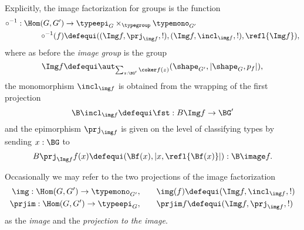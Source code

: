 Explicitly, the image factorization for groups is the function
\begin{align*}
\circ^{-1}:\Hom(G,G')&\to\typeepi_G\times_{\typegroup}\typemono_{G'}\\
\circ^{-1}(f)&\defequi ((\Img f,\prj_{\img f},!),(\Img f,\incl_{\img f},!),\refl{\Img f}),
\end{align*}
    where as before the \emph{image group} is the group
    $$\Img f\defequi \aut_{\sum_{z:\BG'}\coker f(z)}(\shape_{G'},|\shape_G,p_f|),$$
    the monomorphism $\incl_{\img f}$ is obtained from the wrapping of the first projection
    $$\B\incl_{\img f}\defequi\fst: B\Img f\to \BG'$$
    and
the epimorphism
  $\prj_{\img f}$  is given on the level of classifying types by sending $x:\BG$ to
  $$B\prj_{\Img f} f(x)\defequi (\Bf(x),|x,\refl{\Bf(x)}|):\B\image f.$$

    
 Occasionally we may refer to the two projections of the image factorization
 \begin{align*}
    \img:\Hom(G,G')\to\typemono_{G'},\qquad&\img(f)\defequi(\Img f,\incl_{\img f},!)\\
 \prjim:\Hom(G,G')\to\typeepi_G, \qquad&\prjim f\defequi(\Img f,\prj_{\img f},!)
  \end{align*}
  as the \emph{image} and the \emph{projection to the image}.


